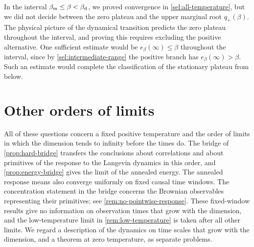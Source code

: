 In the interval $\beta_{\mathrm m}\le\beta<\beta_{\mathrm d}$, we proved convergence in \cref{sel:all-temperature}, but we did not decide between the zero plateau and the upper marginal root $q_+(\beta)$. The physical picture of the dynamical transition \cite{ck1993,chs1993} predicts the zero plateau throughout the interval, and proving this requires excluding the positive alternative. One sufficient estimate would be $e_\beta(\infty)\le\beta$ throughout the interval, since by \cref{sel:intermediate-range} the positive branch has $e_\beta(\infty)>\beta$. Such an estimate would complete the classification of the stationary plateau from below.

\section{Other orders of limits}\label{sec:discussion-limits}

All of these questions concern a fixed positive temperature and the order of limits in which the dimension tends to infinity before the times do. The bridge of \cref{prop:hard-bridge} transfers the conclusions about correlations and about primitives of the response to the Langevin dynamics in this order, and \cref{prop:energy-bridge} gives the limit of the annealed energy. The annealed response means also converge uniformly on fixed causal time windows. The concentration statement in the bridge concerns the Brownian observables representing their primitives; see \cref{rem:no-pointwise-response}. These fixed-window results give no information on observation times that grow with the dimension, and the low-temperature limit in \cref{rem:low-temperature} is taken after all other limits. We regard a description of the dynamics on time scales that grow with the dimension, and a theorem at zero temperature, as separate problems.
